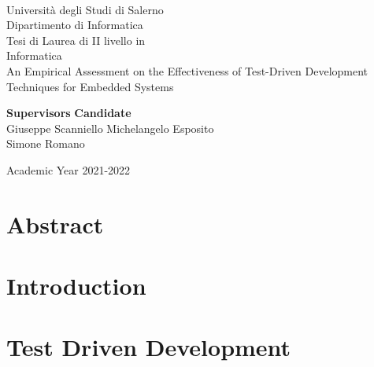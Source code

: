 \documentclass[11pt,oneside]{book}
\begin{document}
    \begin{titlepage}
        \begin{center}
            \\[0.2truecm]
            {\Large Universit\`a degli Studi di Salerno}\\[0.2truecm]
            {\large Dipartimento di Informatica}\\
            \hrulefill
            \vfill
            {\large Tesi di Laurea di II livello in }\\[0.2truecm]
            {\Large Informatica}\\
            \vfill\vfill
            {\Huge An Empirical Assessment on the Effectiveness of Test-Driven Development Techniques for Embedded Systems}
            \vfill\vfill
            
            
            {\bf Supervisors} \hfill {\bf Candidate}\ \ \\
            Giuseppe Scanniello \hfill Michelangelo Esposito\\
            Simone Romano \hfill \ \ \\
            
            \vfill
            \hrulefill 
            
            Academic Year 2021-2022
        
        \end{center}
    \end{titlepage}


    \chapter*{Abstract}
    
    
    \tableofcontents
    \pagestyle{plain}

    
    

    \chapter{Introduction}
    \setcounter{page}{1} 	%
    

    \chapter{Test Driven Development}
    
\end{document}
